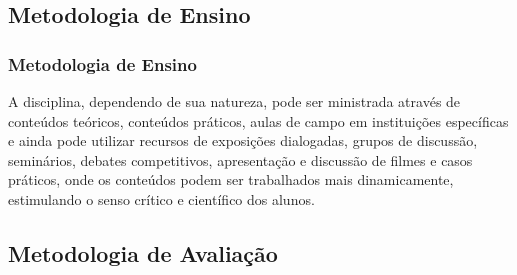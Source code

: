 \subsection[Metodologia de Ensino]{Metodologia de Ensino}\label{subsec:plano-ensino-metodologia}



\begin{frame}[t]\frametitle{Metodologia de Ensino}

  \begin{block}{}
    \justifying{}
    \Large
    A disciplina, dependendo de sua natureza, pode ser ministrada através de conteúdos teóricos, conteúdos práticos, aulas de campo em instituições específicas e ainda pode utilizar recursos de exposições dialogadas, grupos de discussão, seminários, debates competitivos, apresentação e discussão de filmes e casos práticos, onde os conteúdos podem ser trabalhados mais dinamicamente, estimulando o senso crítico e científico dos alunos.
  \end{block}

\end{frame}



\subsection[Metodologia de Avaliação]{Metodologia de Avaliação}\label{subsec:plano-ensino-avaliacao}




